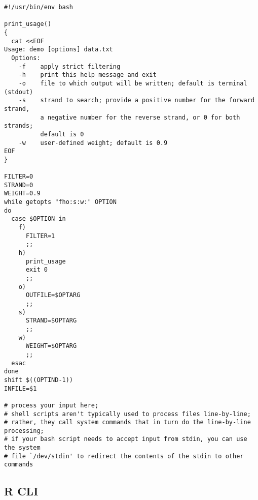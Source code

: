 \documentclass{article}
\begin{document}
\begin{verbatim}
#!/usr/bin/env bash

print_usage()
{
  cat <<EOF
Usage: demo [options] data.txt
  Options:
    -f    apply strict filtering
    -h    print this help message and exit
    -o    file to which output will be written; default is terminal (stdout)
    -s    strand to search; provide a positive number for the forward strand,
          a negative number for the reverse strand, or 0 for both strands;
          default is 0
    -w    user-defined weight; default is 0.9
EOF
}

FILTER=0
STRAND=0
WEIGHT=0.9
while getopts "fho:s:w:" OPTION
do
  case $OPTION in
    f)
      FILTER=1
      ;;
    h)
      print_usage
      exit 0
      ;;
    o)
      OUTFILE=$OPTARG
      ;;
    s)
      STRAND=$OPTARG
      ;;
    w)
      WEIGHT=$OPTARG
      ;;
  esac
done
shift $((OPTIND-1))
INFILE=$1

# process your input here;
# shell scripts aren't typically used to process files line-by-line;
# rather, they call system commands that in turn do the line-by-line processing;
# if your bash script needs to accept input from stdin, you can use the system
# file `/dev/stdin' to redirect the contents of the stdin to other commands
\end{verbatim}

\subsection{R CLI}
\end{document}
